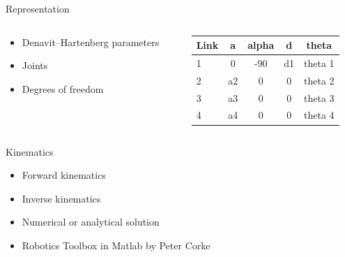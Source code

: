 \documentclass{beamer}
\begin{document}
\begin{frame}{Representation}

    \begin{columns}
        \begin{column}[]{0.5\textwidth}
            \begin{itemize}
                \item Denavit–Hartenberg parameters
                \item Joints
                \item Degrees of freedom
            \end{itemize}
        \end{column}
        
        
        \begin{column}[]{0.5\textwidth}
            \begin{table}
                \begin{tabular}{l | c | c | c | c }
                Link & a & alpha & d & theta \\
                \hline \hline
                   1 & 0   & -90 & d1 & theta 1\\
                    2 & a2& 0 & 0 & theta 2\\
                    3  & a3 & 0 & 0& theta 3\\
                    4 & a4 & 0 & 0 & theta 4\\
                \end{tabular}
            \end{table} 
        \end{column}
    \end{columns}
    
\end{frame}




\begin{frame}{Kinematics}

    \begin{itemize}
        \item Forward kinematics
        \item Inverse kinematics
        \item Numerical or analytical solution
        \item Robotics Toolbox in Matlab by Peter Corke
    \end{itemize}

    
\end{frame}
\end{document}
